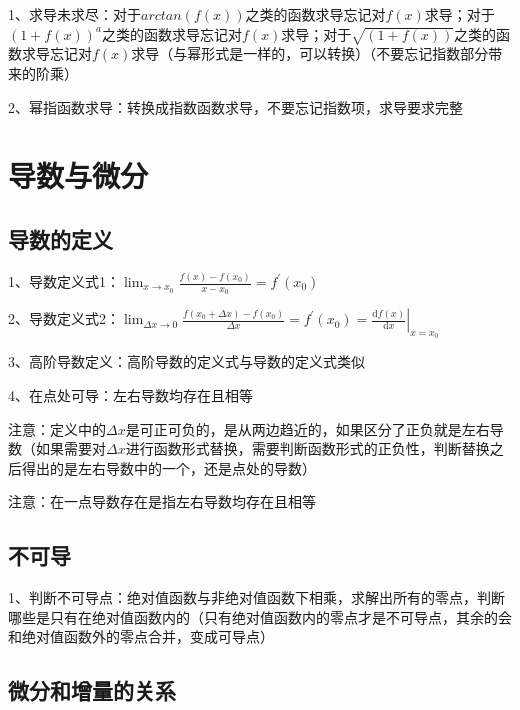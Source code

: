 1、求导未求尽：对于$arctan(f(x))$之类的函数求导忘记对$f(x)$求导；对于$(1+f(x))^{a}$之类的函数求导忘记对$f(x)$求导；对于$\sqrt{(1+f(x))}$之类的函数求导忘记对$f(x)$求导（与幂形式是一样的，可以转换）（不要忘记指数部分带来的阶乘）

2、幂指函数求导：转换成指数函数求导，不要忘记指数项，求导要求完整

\section{导数与微分}



\subsection{导数的定义}

1、导数定义式1：$\lim _{x \rightarrow x_{0}} \frac{f(x)-f\left(x_{0}\right)}{x-x_{0}}=f^{\prime}\left(x_{0}\right)$

2、导数定义式2：$\lim _{\Delta x \rightarrow 0} \frac{f\left(x_{0}+\Delta x\right)-f\left(x_{0}\right)}{\Delta x}=f^{\prime}\left(x_{0}\right)=\left.\frac{\mathrm{d} f(x)}{\mathrm{d} x}\right|_{x=x_{0}}$

3、高阶导数定义：高阶导数的定义式与导数的定义式类似

4、在点处可导：左右导数均存在且相等

注意：定义中的$\Delta x$是可正可负的，是从两边趋近的，如果区分了正负就是左右导数（如果需要对$\Delta x$进行函数形式替换，需要判断函数形式的正负性，判断替换之后得出的是左右导数中的一个，还是点处的导数）

注意：在一点导数存在是指左右导数均存在且相等



\subsection{不可导}

1、判断不可导点：绝对值函数与非绝对值函数下相乘，求解出所有的零点，判断哪些是只有在绝对值函数内的（只有绝对值函数内的零点才是不可导点，其余的会和绝对值函数外的零点合并，变成可导点）



\subsection{微分和增量的关系}

